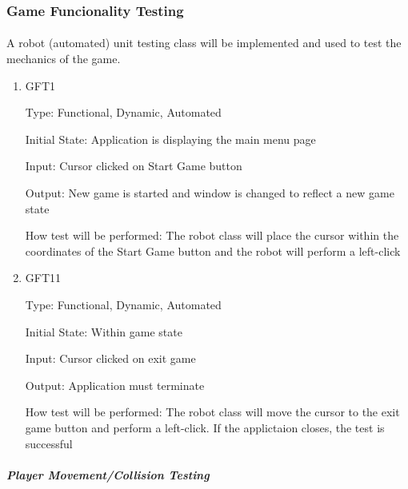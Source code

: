 \documentclass[12pt, titlepage]{article}
\begin{document}
\subsubsection{Game Funcionality Testing}
		
\paragraph{}
A robot (automated) unit testing class will be implemented and used to test the mechanics of the game.

\begin{enumerate}

\item{GFT1\\}

Type: Functional, Dynamic, Automated
					
Initial State: Application is displaying the main menu page
					
Input: Cursor clicked on Start Game button
					
Output: New game is started and window is changed to reflect a new game state
					
How test will be performed: The robot class will place the cursor within the coordinates of the Start Game button and the robot will perform a left-click

\item{GFT11\\}

Type: Functional, Dynamic, Automated
					
Initial State: Within game state
					
Input: Cursor clicked on exit game
					
Output: Application must terminate

How test will be performed: The robot class will move the cursor to the exit game button and perform a left-click. If the applictaion closes, the test is successful

\end{enumerate}

\subparagraph{Player Movement/Collision Testing}
\end{document}

